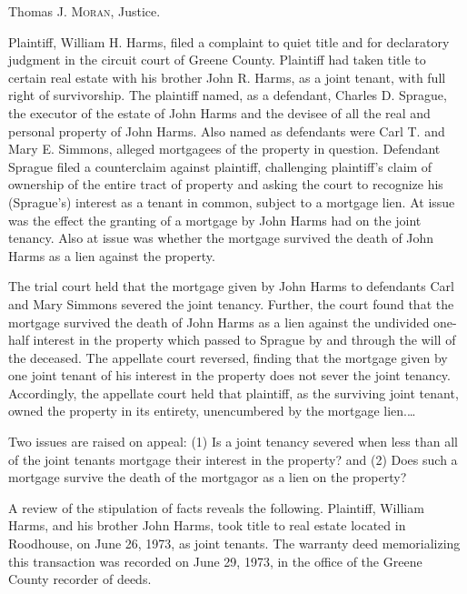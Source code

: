 

Thomas J. \textsc{Moran}, Justice.

Plaintiff, William H. Harms, filed a complaint to quiet title and for
declaratory judgment in the circuit court of Greene County. Plaintiff had taken
title to certain real estate with his brother John R. Harms, as a joint tenant,
with full right of survivorship. The plaintiff named, as a defendant, Charles
D. Sprague, the executor of the estate of John Harms and the devisee of all the
real and personal property of John Harms. Also named as defendants were Carl T.
and Mary E. Simmons, alleged mortgagees of the property in question. Defendant
Sprague filed a counterclaim against plaintiff, challenging plaintiff's claim
of ownership of the entire tract of property and asking the court to recognize
his (Sprague's) interest as a tenant in common, subject to a mortgage lien. At
issue was the effect the granting of a mortgage by John Harms had on the joint
tenancy. Also at issue was whether the mortgage survived the death of John
Harms as a lien against the property.

The trial court held that the mortgage given by John Harms to defendants Carl
and Mary Simmons severed the joint tenancy. Further, the court found that the
mortgage survived the death of John Harms as a lien against the undivided
one-half interest in the property which passed to Sprague by and through the
will of the deceased. The appellate court reversed, finding that the mortgage
given by one joint tenant of his interest in the property does not sever the
joint tenancy. Accordingly, the appellate court held that plaintiff, as the
surviving joint tenant, owned the property in its entirety, unencumbered by the
mortgage lien.\dots

Two issues are raised on appeal: (1) Is a joint tenancy severed when less than
all of the joint tenants mortgage their interest in the property? and (2) Does
such a mortgage survive the death of the mortgagor as a lien on the property?

 A review of the stipulation of facts reveals the following. Plaintiff, William
Harms, and his brother John Harms, took title to real estate located in
Roodhouse, on June 26, 1973, as joint tenants. The warranty deed memorializing
this transaction was recorded on June 29, 1973, in the office of the Greene
County recorder of deeds.

